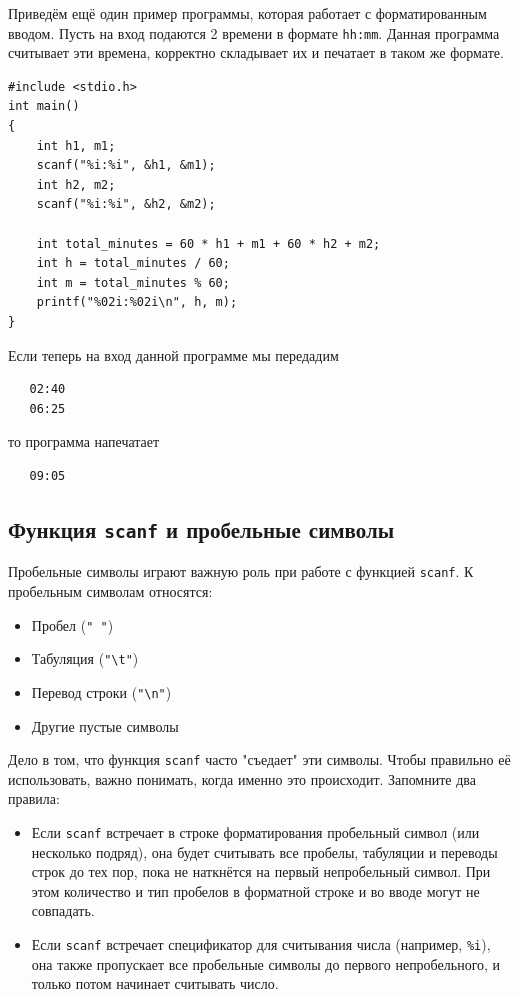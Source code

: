 \documentclass[10pt]{article}
\begin{document}
\noindent Приведём ещё один пример программы, которая работает с форматированным вводом. Пусть на вход подаются 2 времени в формате \texttt{hh:mm}. Данная программа считывает эти времена, корректно складывает их и печатает в таком же формате.
\begin{lstlisting}
#include <stdio.h>
int main()
{
    int h1, m1;
    scanf("%i:%i", &h1, &m1);
    int h2, m2;
    scanf("%i:%i", &h2, &m2);

    int total_minutes = 60 * h1 + m1 + 60 * h2 + m2;
    int h = total_minutes / 60;
    int m = total_minutes % 60;
    printf("%02i:%02i\n", h, m);
}
\end{lstlisting}
Если теперь на вход данной программе мы передадим
\begin{verbatim}
   02:40 
   06:25
\end{verbatim}
то программа напечатает
\begin{verbatim}
   09:05
\end{verbatim}

\subsection*{Функция \texttt{scanf} и пробельные символы}
Пробельные символы играют важную роль при работе с функцией \texttt{scanf}. К пробельным символам относятся:
\begin{itemize}
\item Пробел (\texttt{{}"{} {}"{}})
\item Табуляция  (\texttt{"\textbackslash t"})
\item Перевод строки  (\texttt{"\textbackslash n"})
\item Другие пустые символы
\end{itemize}
Дело в том, что функция \texttt{scanf} часто "съедает"{} эти символы. Чтобы правильно её использовать, важно понимать, когда именно это происходит. Запомните два правила:
\begin{itemize}
\item Если \texttt{scanf} встречает в строке форматирования пробельный символ (или несколько подряд), она будет считывать все пробелы, табуляции и переводы строк до тех пор, пока не наткнётся на первый непробельный символ. При этом количество и тип пробелов в форматной строке и во вводе могут не совпадать.

\item Если \texttt{scanf} встречает спецификатор для считывания числа (например, \texttt{\%i}), она также пропускает все пробельные символы до первого непробельного, и только потом начинает считывать число.
\end{itemize}
 
\end{document}
